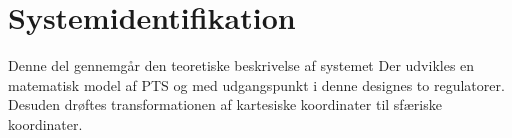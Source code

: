 \part{Systemidentifikation}
Denne del gennemgår den teoretiske beskrivelse af systemet
Der udvikles en matematisk model af PTS
og med udgangspunkt i denne designes to regulatorer.
Desuden drøftes transformationen af kartesiske koordinater til sfæriske koordinater.




